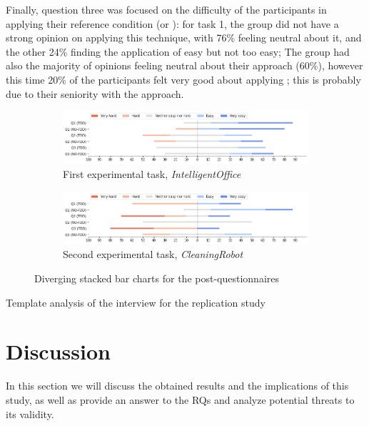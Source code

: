 Finally, question three was focused on the difficulty of the participants in applying their reference condition (\ie \tdd or \notdd): for task 1, the \tdd group did not have a strong opinion on applying this technique, with 76\% feeling neutral about it, and the other 24\% finding the application of \tdd easy but not too easy; The \notdd group had also the majority of opinions feeling neutral about their approach (60\%), however this time 20\% of the participants felt very good about applying \notdd; this is probably due to their seniority with the approach.


\begin{figure}[htbp]
    \begin{subfigure}{\textwidth}
        \includegraphics[width=\textwidth]{figures/bar_charts/task1.png}
        \caption{First experimental task, \textit{IntelligentOffice}}
    \end{subfigure}
    
    \bigskip
    
    \begin{subfigure}{\textwidth}
        \includegraphics[width=\textwidth]{figures/bar_charts/task2.png}
        \caption{Second experimental task, \textit{CleaningRobot}}
    \end{subfigure}
    
    \caption{Diverging stacked bar charts for the post-questionnaires}
    \label{bar_charts}
\end{figure}


Template analysis of the interview for the replication study


\section{Discussion}
In this section we will discuss the obtained results and the implications of this study, as well as provide an answer to the RQs and analyze potential threats to its validity.

